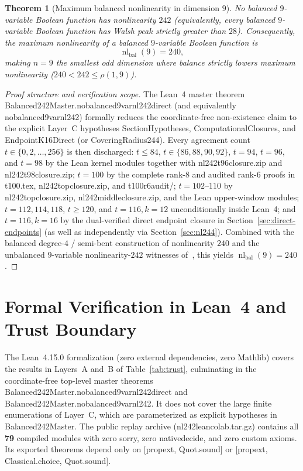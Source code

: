 \documentclass[11pt]{article}
\newtheorem{theorem}{Theorem}[section]
\theoremstyle{definition}
\newcommand{\nl}{\operatorname{nl}}
\newcommand{\code}[1]{{\ttfamily\small\renewcommand{\_}{\textunderscore\allowbreak}#1}}
\begin{document}
\begin{theorem}[Maximum balanced nonlinearity in dimension $9$]
\label{thm:main-nl240}
No balanced $9$-variable Boolean function has nonlinearity $242$ (equivalently, every balanced $9$-variable Boolean function has Walsh peak strictly greater than $28$).
Consequently, the maximum nonlinearity of a balanced $9$-variable Boolean function is
\[
  \nl_{\mathrm{bal}}(9) = 240,
\]
making $n = 9$ the smallest odd dimension where balance strictly lowers maximum nonlinearity ($240 < 242 \le \rho(1,9)$).
\end{theorem}

\begin{proof}[Proof structure and verification scope]
The Lean~4 master theorem \code{Balanced242Master.no\_balanced\_9var\_nl242\_direct} (and equivalently \code{no\_balanced\_9var\_nl242}) formally reduces the coordinate-free non-existence claim to the explicit Layer~C hypotheses \code{SectionHypotheses}, \code{ComputationalClosures}, and \code{EndpointK16Direct} (or \code{CoveringRadius244}). Every agreement count $t \in \{0,2,\dots,256\}$ is then discharged: $t \le 84$, $t \in \{86,88,90,92\}$, $t=94$, $t=96$, and $t=98$ by the Lean kernel modules together with \code{nl242\_t96\_closure.zip} and \code{nl242\_t98\_closure.zip}; $t=100$ by the complete rank-$8$ and audited rank-$6$ proofs in \code{t100.tex}, \code{nl242\_top\_closure.zip}, and \code{t100\_r6\_audit/}; $t=102$--$110$ by \code{nl242\_top\_closure.zip}, \code{nl242\_middle\_closure.zip}, and the Lean upper-window modules; $t=112, 114, 118$, $t \ge 120$, and $t=116, k=12$ unconditionally inside Lean~4; and $t=116, k=16$ by the dual-verified direct endpoint closure in Section~\ref{sec:direct-endpoints} (as well as independently via Section~\ref{sec:nl244}). Combined with the balanced degree-$4$ / semi-bent construction of nonlinearity $240$ and the unbalanced $9$-variable nonlinearity-$242$ witnesses of~\cite{KMY2007}, this yields $\nl_{\mathrm{bal}}(9) = 240$.
\end{proof}

\section{Formal Verification in Lean~4 and Trust Boundary}
\label{sec:verification}

The Lean~4.15.0 formalization (zero external dependencies, zero Mathlib) covers the results in Layers~A and~B of Table~\ref{tab:trust}, culminating in the coordinate-free top-level master theorems \code{Balanced242Master.\allowbreak no\_balanced\_9var\_nl242\_direct} and \code{Balanced242Master.\allowbreak no\_balanced\_9var\_nl242}. It does not cover the large finite enumerations of Layer~C, which are parameterized as explicit hypotheses in \code{Balanced242Master}.
The public replay archive (\code{nl242\_lean\_colab.tar.gz}) contains all \textbf{79} compiled modules with zero \code{sorry}, zero \code{native\_decide}, and zero custom axioms. Its exported theorems depend only on \code{[propext, Quot.sound]} or \code{[propext, Classical.choice, Quot.sound]}.
\end{document}
